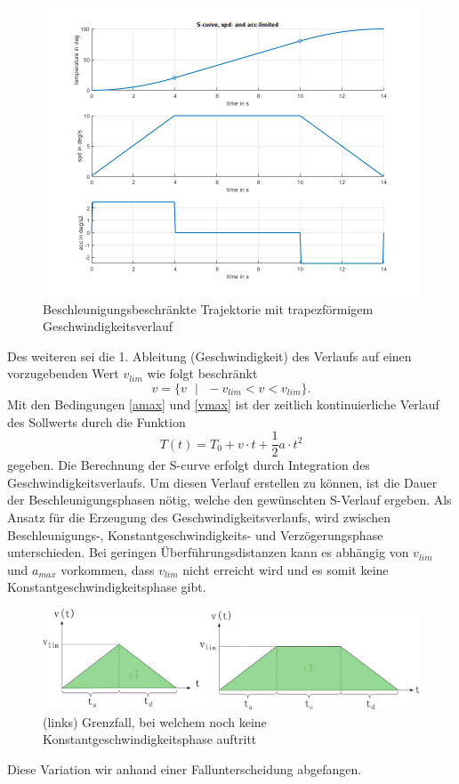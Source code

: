 \documentclass[a4paper, 10pt]{scrartcl}
\begin{document}
		\begin{figure}[h!]
			\centering
			\includegraphics[width=0.8\linewidth]{./pics/trapez.png}
			\caption{Beschleunigungsbeschränkte Trajektorie mit trapezförmigem Geschwindigkeitsverlauf}
		\end{figure}
		
		Des weiteren sei die 1. Ableitung (Geschwindigkeit) des Verlaufs auf einen vorzugebenden Wert $ v_{lim} $ wie folgt beschränkt
		\begin{equation}
			v = \{v \text{ } | \text{ } -v_{lim} < v < v_{lim}\}.
			\label{vmax}
		\end{equation}
		Mit den Bedingungen \eqref{amax} und \eqref{vmax} ist der zeitlich kontinuierliche Verlauf des Sollwerts durch die Funktion
		\begin{equation}
			T(t) = T_{0} + v\cdot t + \frac{1}{2}a\cdot t^{2}
		\end{equation}
		gegeben. Die Berechnung der S-curve erfolgt durch Integration des Geschwindigkeitsverlaufs. Um diesen Verlauf erstellen zu können, ist die Dauer der Beschleunigungsphasen nötig, welche den gewünschten S-Verlauf ergeben. Als Ansatz für die Erzeugung des Geschwindigkeitsverlaufs, wird zwischen Beschleunigungs-, Konstantgeschwindigkeits- und Verzögerungsphase unterschieden. Bei geringen Überführungsdistanzen kann es abhängig von $ v_{lim} $ und $ a_{max} $ vorkommen, dass $ v_{lim} $ nicht erreicht wird und es somit keine Konstantgeschwindigkeitsphase gibt.
		\begin{figure}[h!]
			\centering
			\includegraphics[width=\linewidth]{./pics/bedingungen.png}
			\caption{(links) Grenzfall, bei welchem noch keine Konstantgeschwindigkeitsphase auftritt}
		\end{figure}
		Diese Variation wir anhand einer Fallunterscheidung abgefangen.
	
\end{document}
